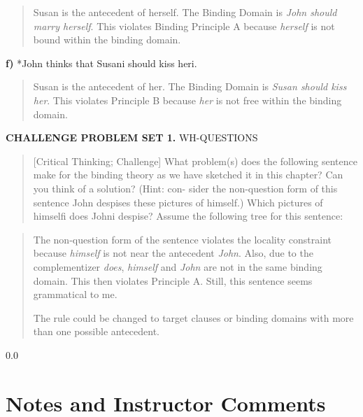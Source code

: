 \documentclass[11pt,notitlepage]{article}
\newcommand{\question}[2]{\textbf{#1.} #2}
\newcommand{\subquestion}[2]{\par\hspace{0.5cm} \textbf{#1)} #2}
\begin{document}
\begin{quote}
  Susan is the antecedent of herself. The Binding Domain is
  \emph{John should marry herself}. This violates Binding Principle A 
  because \emph{herself} is not bound within the binding domain.
\end{quote}

\subquestion{f}{*John thinks that Susani should kiss heri.}

\begin{quote}
  Susan is the antecedent of her. The Binding Domain is
  \emph{Susan should kiss her}. This violates Principle B
   because \emph{her} is not free within the binding domain.
\end{quote}

\question{CHALLENGE PROBLEM SET 1}{WH-QUESTIONS}
\begin{quote}
[Critical Thinking; Challenge]
What problem(s) does the following sentence make for the binding theory as we have sketched it in this chapter? Can you think of a solution? (Hint: con- sider the non-question form of this sentence John despises these pictures of himself.)
Which pictures of himselfi does Johni despise? Assume the following
tree for this sentence:
\end{quote}

\begin{quote}
  The non-question form of the sentence violates the locality
  constraint because \emph{himself} is not near the antecedent
  \emph{John}. Also, due to the complementizer \emph{does},
  \emph{himself} and \emph{John} are not in the same binding
  domain. This then violates Principle A. Still, this sentence seems
  grammatical to me.

  The rule could be changed to target clauses or binding domains with
  more than one possible antecedent.
\end{quote}

\newpage
  {\setlength{\baselineskip}%
           {0.0\baselineskip}
  \section*{Notes and Instructor Comments}
  \hrulefill \par}
\end{document}
